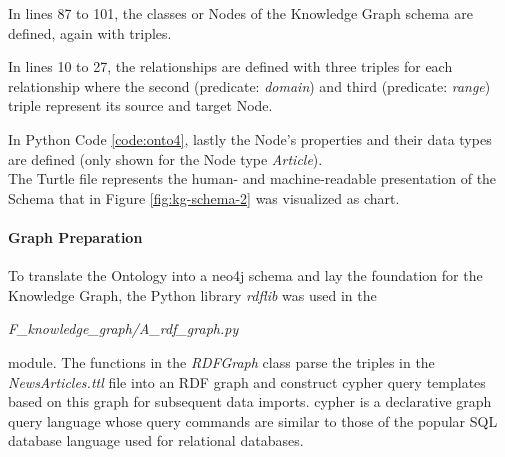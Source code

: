 
In lines 87 to 101, the classes or Nodes of the Knowledge Graph schema are defined, again with triples.


In lines 10 to 27, the relationships are defined with three triples for each relationship
where the second (predicate: \emph{domain}) and third (predicate: \emph{range}) triple represent its source and target Node.


In Python Code \ref{code:onto4}, lastly the Node's properties and their data types are defined (only shown for the Node type \emph{Article}).\\

The Turtle file represents the human- and machine-readable presentation of the Schema that in Figure \ref{fig:kg-schema-2} was visualized as chart.

\paragraph{Graph Preparation}\label{par:graph-prep}
To translate the Ontology into a neo4j schema and lay the foundation for the Knowledge Graph,
the Python library \emph{rdflib} \cite{rdflib} was used in the
\begin{center}
\emph{F\_knowledge\_graph/A\_rdf\_graph.py}
\end{center}
module.
The functions in the \emph{RDFGraph} class parse the triples in the \emph{NewsArticles.ttl} file into an RDF \cite{rdfs} graph and construct \gls{cypher} \cite{cypher} query templates based on this graph for subsequent data imports.
\gls{cypher} \cite{cypher} is a declarative graph query language whose query commands are similar to those of the popular SQL \cite{sql} database language used for relational databases.\\

